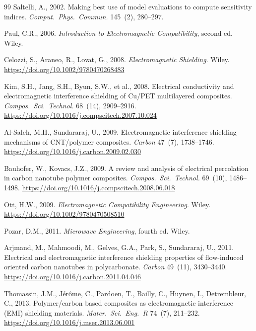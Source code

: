 \documentclass[review,3p,authoryear]{elsarticle}
\begin{document}
\begin{thebibliography}{99}
Saltelli, A., 2002.
Making best use of model evaluations to compute sensitivity indices.
\textit{Comput.\ Phys.\ Commun.} 145~(2), 280--297.

Paul, C.R., 2006.
\textit{Introduction to Electromagnetic Compatibility}, second ed. Wiley.

Celozzi, S., Araneo, R., Lovat, G., 2008.
\textit{Electromagnetic Shielding}. Wiley.
\url{https://doi.org/10.1002/9780470268483}

Kim, S.H., Jang, S.H., Byun, S.W., et al., 2008.
Electrical conductivity and electromagnetic interference shielding of Cu/PET multilayered composites.
\textit{Compos.\ Sci.\ Technol.} 68~(14), 2909--2916.
\url{https://doi.org/10.1016/j.compscitech.2007.10.024}

Al-Saleh, M.H., Sundararaj, U., 2009.
Electromagnetic interference shielding mechanisms of CNT/polymer composites.
\textit{Carbon} 47~(7), 1738--1746.
\url{https://doi.org/10.1016/j.carbon.2009.02.030}

Bauhofer, W., Kovacs, J.Z., 2009.
A review and analysis of electrical percolation in carbon nanotube polymer composites.
\textit{Compos.\ Sci.\ Technol.} 69~(10), 1486--1498.
\url{https://doi.org/10.1016/j.compscitech.2008.06.018}

Ott, H.W., 2009.
\textit{Electromagnetic Compatibility Engineering}. Wiley.
\url{https://doi.org/10.1002/9780470508510}

Pozar, D.M., 2011.
\textit{Microwave Engineering}, fourth ed. Wiley.

Arjmand, M., Mahmoodi, M., Gelves, G.A., Park, S., Sundararaj, U., 2011.
Electrical and electromagnetic interference shielding properties of flow-induced oriented carbon nanotubes in polycarbonate.
\textit{Carbon} 49~(11), 3430--3440.
\url{https://doi.org/10.1016/j.carbon.2011.04.046}

Thomassin, J.M., J\'er\^ome, C., Pardoen, T., Bailly, C., Huynen, I., Detrembleur, C., 2013.
Polymer/carbon based composites as electromagnetic interference (EMI) shielding materials.
\textit{Mater.\ Sci.\ Eng.\ R} 74~(7), 211--232.
\url{https://doi.org/10.1016/j.mser.2013.06.001}


\end{thebibliography}
\end{document}
